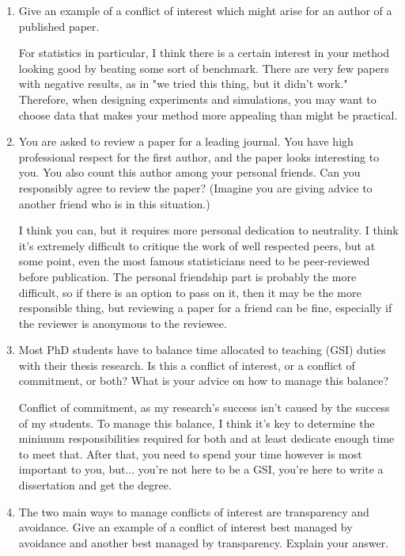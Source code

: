 \documentclass[12pt]{article}
\begin{document}
\begin{enumerate}
\item Give an example of a conflict of interest which might arise for an author of a published paper.

For statistics in particular, I think there is a certain interest in your method looking good
by beating some sort of benchmark. There are very few papers with negative results, as in "we tried this thing, but it didn't work." Therefore, when designing experiments and simulations, you
may want to choose data that makes your method more appealing than might be practical.

\item You are asked to review a paper for a leading journal. You have high professional respect for the first author, and the paper looks interesting to you. You also count this author among your personal friends. Can you responsibly agree to review the paper? (Imagine you are giving advice to another friend who is in this situation.)

I think you can, but it requires more personal dedication to neutrality. I think it's extremely difficult to critique the work of well respected peers, but at some point, even the most famous statisticians need to be peer-reviewed before publication. The personal friendship part is probably the more difficult, so if there is an option to pass on it, then it may be the more responsible thing, but reviewing a paper for a friend can be fine, especially if the reviewer is anonymous to the reviewee.

\item Most PhD students have to balance time allocated to teaching (GSI) duties with their thesis research. Is this a conflict of interest, or a conflict of commitment, or both? What is your advice on how to manage this balance?

Conflict of commitment, as my research's success isn't caused by the success of my students. To manage this balance, I think it's key to determine the minimum responsibilities required for both and at least dedicate enough time to meet that. After that, you need to spend your time however is most important to you, but... you're not here to be a GSI, you're here to write a dissertation and get the degree.

\item The two main ways to manage conflicts of interest are transparency and avoidance. Give an example of a conflict of interest best managed by avoidance and another best managed by transparency. Explain your answer.


\end{enumerate}
\end{document}

